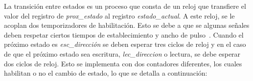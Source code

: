 %	

%
%	
%	
%	
%	
%	
%	

La transición entre estados es un proceso que consta de un reloj que  transfiere el valor del registro de \textit{prox\_estado} al registro \textit{estado\_actual}. A este reloj, se le acoplan dos temporizadores de habilitación. Esto se debe a que se algunas señales deben respetar ciertos tiempos de establecimiento y ancho de pulso~\cite{Cypress2017}. Cuando el próximo estado es \textit{esc\_dirección} se deben esperar tres ciclos de reloj y en el caso de que el próximo estado sea escritura, \textit{lec\_direccion} o lectura, se debe esperar dos ciclos de reloj.
Esto se implementa con dos contadores diferentes, los cuales habilitan o no el cambio de estado, lo que se detalla a continuación:

